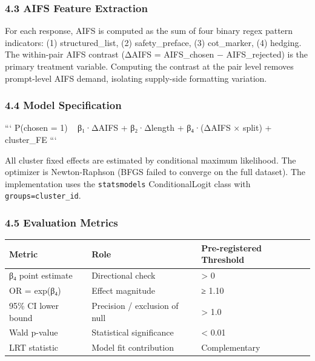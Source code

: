 \subsubsection{4.3 AIFS Feature Extraction}

For each response, AIFS is computed as the sum of four binary regex pattern indicators: (1) structured_list, (2) safety_preface, (3) cot_marker, (4) hedging. The within-pair AIFS contrast (ΔAIFS = AIFS_chosen − AIFS_rejected) is the primary treatment variable. Computing the contrast at the pair level removes prompt-level AIFS demand, isolating supply-side formatting variation.

\subsubsection{4.4 Model Specification}

```
P(chosen = 1) ~ β₁·ΔAIFS + β₂·Δlength + β₄·(ΔAIFS × split) + cluster_FE
```

All cluster fixed effects are estimated by conditional maximum likelihood. The optimizer is Newton-Raphson (BFGS failed to converge on the full dataset). The implementation uses the \texttt{statsmodels} ConditionalLogit class with \texttt{groups=cluster_id}.

\subsubsection{4.5 Evaluation Metrics}

\begin{table}[htbp]
\centering
\begin{tabular}{lll}
\toprule
Metric & Role & Pre-registered Threshold \\
\midrule
β₄ point estimate & Directional check & > 0 \\
OR = exp(β₄) & Effect magnitude & ≥ 1.10 \\
95\% CI lower bound & Precision / exclusion of null & > 1.0 \\
Wald p-value & Statistical significance & < 0.01 \\
LRT statistic & Model fit contribution & Complementary \\
\bottomrule
\end{tabular}
\end{table}

